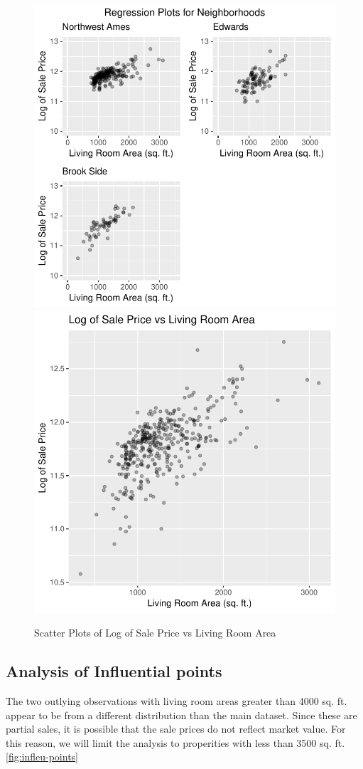 \documentclass[american,]{article}
\begin{document}
\begin{figure}[htbp]

{\centering \includegraphics[width=0.45\linewidth]{HousePriceRegressionAnalysis_files/figure-latex/scatter-plots-1} \includegraphics[width=0.45\linewidth]{HousePriceRegressionAnalysis_files/figure-latex/scatter-plots-2} 

}

\caption{Scatter Plots of Log of Sale Price vs Living Room Area}\label{fig:scatter-plots}
\end{figure}

\hypertarget{analysis-of-influential-points}{%
\subsection{Analysis of Influential
points}\label{analysis-of-influential-points}}

\label{appendix:infleu-points}

The two outlying observations with living room areas greater than 4000
sq. ft. appear to be from a different distribution than the main
dataset. Since these are partial sales, it is possible that the sale
prices do not reflect market value. For this reason, we will limit the
analysis to properities with less than 3500 sq. ft.
\ref{fig:infleu-points}
\end{document}
